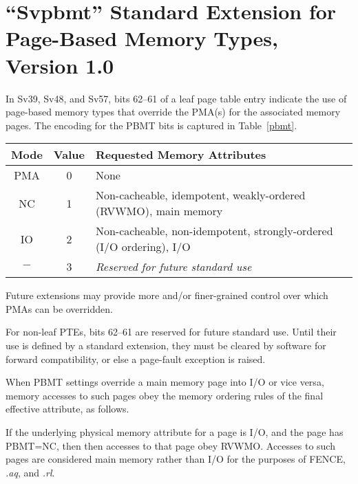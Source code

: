\chapter{``Svpbmt'' Standard Extension for Page-Based Memory Types, Version 1.0}
\label{svpbmt}

In Sv39, Sv48, and Sv57, bits 62--61 of a leaf page table entry indicate the use
of page-based memory types that override the PMA(s) for the associated memory
pages.  The encoding for the PBMT bits is captured in Table~\ref{pbmt}.

\begin{table*}[h!]
\begin{center}
\begin{tabular}{|c|c|l|}
\hline
Mode & Value  & Requested Memory Attributes \\
\hline
PMA  & 0      & None \\
NC   & 1      & Non-cacheable, idempotent, weakly-ordered (RVWMO), main memory \\
IO   & 2      & Non-cacheable, non-idempotent, strongly-ordered (I/O ordering), I/O \\
$-$  & 3      & {\em Reserved for future standard use} \\
\hline
\end{tabular}
\end{center}
\caption{Encodings for the PBMT field in Sv39, Sv48, and Sv57 PTEs.  Attributes
not mentioned are inherited from the PMA associated with the physical address.}
\label{pbmt}
\end{table*}

\begin{commentary}
Future extensions may provide more and/or finer-grained control over which PMAs
can be overridden.
\end{commentary}

For non-leaf PTEs, bits 62--61 are reserved for future standard use.  Until
their use is defined by a standard extension, they must be cleared by software
for forward compatibility, or else a page-fault exception is raised.

When PBMT settings override a main memory page into I/O or vice versa, memory
accesses to such pages obey the memory ordering rules of the final effective
attribute, as follows.

If the underlying physical memory attribute for a page is I/O, and the page has
PBMT=NC, then then accesses to that page obey RVWMO.  Accesses to such pages are
considered main memory rather than I/O for the purposes of FENCE, {\em.aq}, and
{\em.rl}.

